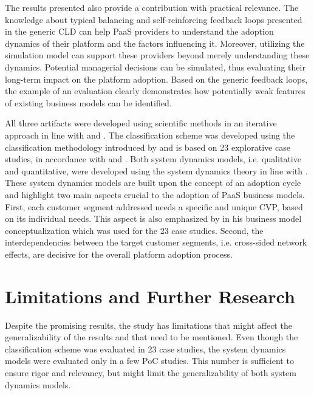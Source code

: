 	The results presented also provide a contribution with practical relevance. The knowledge about typical balancing and self-reinforcing feedback loops presented in the generic \ac{CLD} can help \ac{PaaS} providers to understand the adoption dynamics of their platform and the factors influencing it. Moreover, utilizing the simulation model can support these providers beyond merely understanding these dynamics. Potential managerial decisions can be simulated, thus evaluating their long-term impact on the platform adoption. Based on the generic feedback loops, the example of an evaluation clearly demonstrates how potentially weak features of existing business models can be identified.
	
	All three artifacts were developed using scientific methods in an iterative approach in line with \citet{Hevner2007} and \citet{Peffers2007}. The classification scheme was developed using the classification methodology introduced by \citet{Fettke2003} and is based on 23 explorative case studies, in accordance with \citet{Eisenhardt1989} and \citet{Yin2008}. Both system dynamics models, i.e. qualitative and quantitative, were developed using the system dynamics theory in line with \citet{Sterman2000,Sterman2001}. These system dynamics models are built upon the concept of an adoption cycle \citep{Sterman2001} and highlight two main aspects crucial to the adoption of \ac{PaaS} business models. First, each customer segment addressed needs a specific and unique \ac{CVP}, based on its individual needs. This aspect is also emphasized by \citet{Johnson2008} in his business model conceptualization which was used for the 23 case studies. Second, the interdependencies between the target customer segments, i.e. cross-sided network effects, are decisive for the overall platform adoption process.

	\section{Limitations and Further Research}\label{ch:dc:lfw}

	Despite the promising results, the study has limitations that might affect the generalizability of the results and that need to be mentioned. Even though the classification scheme was evaluated in 23 case studies, the system dynamics models were evaluated only in a few \ac{PoC} studies. This number is sufficient to ensure rigor and relevancy, but might limit the generalizability of both system dynamics models.

